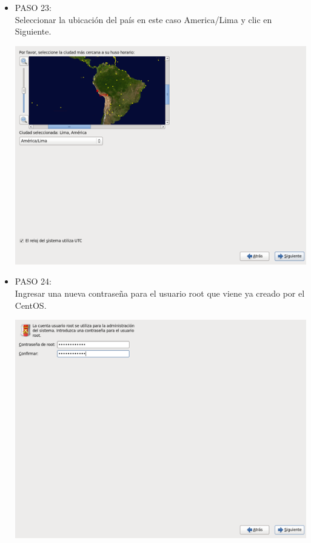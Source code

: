 \begin{itemize}
\item PASO 23:
\\Seleccionar la ubicación del país en este caso America/Lima y clic en Siguiente.
		\begin{center}
		\includegraphics[width=13cm]{./Imagenes/23}
		\end{center}
	
	\end{itemize} 

\begin{itemize}
\item PASO 24:
\\Ingresar una nueva contraseña para el usuario root que viene ya creado por el CentOS.
		\begin{center}
		\includegraphics[width=13cm]{./Imagenes/24}
		\end{center}
	\\\
	\end{itemize} 

